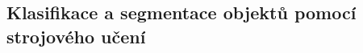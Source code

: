 
\subsection{Klasifikace a segmentace objektů pomocí strojového učení}\label{subsec:klasifikace-a-segmentace-objektu-pomoci-strojoveho-uceni}